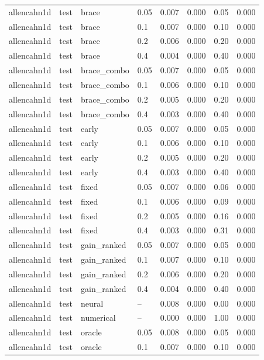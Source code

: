 \begin{longtable}{llllrrrr}
allencahn1d & test & brace & 0.05 & 0.007 & 0.000 & 0.05 & 0.000 \\
allencahn1d & test & brace & 0.1 & 0.007 & 0.000 & 0.10 & 0.000 \\
allencahn1d & test & brace & 0.2 & 0.006 & 0.000 & 0.20 & 0.000 \\
allencahn1d & test & brace & 0.4 & 0.004 & 0.000 & 0.40 & 0.000 \\
allencahn1d & test & brace\_combo & 0.05 & 0.007 & 0.000 & 0.05 & 0.000 \\
allencahn1d & test & brace\_combo & 0.1 & 0.006 & 0.000 & 0.10 & 0.000 \\
allencahn1d & test & brace\_combo & 0.2 & 0.005 & 0.000 & 0.20 & 0.000 \\
allencahn1d & test & brace\_combo & 0.4 & 0.003 & 0.000 & 0.40 & 0.000 \\
allencahn1d & test & early & 0.05 & 0.007 & 0.000 & 0.05 & 0.000 \\
allencahn1d & test & early & 0.1 & 0.006 & 0.000 & 0.10 & 0.000 \\
allencahn1d & test & early & 0.2 & 0.005 & 0.000 & 0.20 & 0.000 \\
allencahn1d & test & early & 0.4 & 0.003 & 0.000 & 0.40 & 0.000 \\
allencahn1d & test & fixed & 0.05 & 0.007 & 0.000 & 0.06 & 0.000 \\
allencahn1d & test & fixed & 0.1 & 0.006 & 0.000 & 0.09 & 0.000 \\
allencahn1d & test & fixed & 0.2 & 0.005 & 0.000 & 0.16 & 0.000 \\
allencahn1d & test & fixed & 0.4 & 0.003 & 0.000 & 0.31 & 0.000 \\
allencahn1d & test & gain\_ranked & 0.05 & 0.007 & 0.000 & 0.05 & 0.000 \\
allencahn1d & test & gain\_ranked & 0.1 & 0.007 & 0.000 & 0.10 & 0.000 \\
allencahn1d & test & gain\_ranked & 0.2 & 0.006 & 0.000 & 0.20 & 0.000 \\
allencahn1d & test & gain\_ranked & 0.4 & 0.004 & 0.000 & 0.40 & 0.000 \\
allencahn1d & test & neural & -- & 0.008 & 0.000 & 0.00 & 0.000 \\
allencahn1d & test & numerical & -- & 0.000 & 0.000 & 1.00 & 0.000 \\
allencahn1d & test & oracle & 0.05 & 0.008 & 0.000 & 0.05 & 0.000 \\
allencahn1d & test & oracle & 0.1 & 0.007 & 0.000 & 0.10 & 0.000 \\

\end{longtable}
